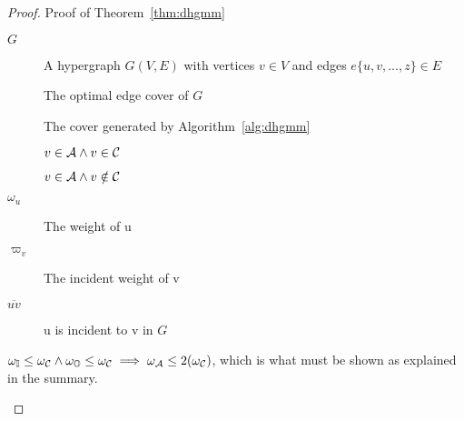 \begin{proof}{Proof of Theorem~\ref{thm:dhgmm}}
  \begin{dfn}
    \begin{description}
    \item[$G$] A hypergraph $G(V,E)$ with vertices $v \in V$ and edges $e\{u,v,...,z\} \in E$
    \item[\cCd] The optimal edge cover of $G$
    \item[\cAd] The cover generated by Algorithm~\ref{alg:dhgmm}
    \item[\bId] $v \in {\mathcal A} \land v\in {\mathcal C}$
    \item[\bOd] $v \in {\mathcal A} \land v\notin {\mathcal C}$
    \item[$\omega_u$] The weight of u
    \item[$\varpi_v$] The incident weight of v
    \item[$ \overline{uv} $] u is incident to v in $G$
    \end{description}
  \end{dfn}
  \begin{prop}
    $\omega_{{\mathbb I}} \le \omega_{{\mathcal C}} \land \omega_{{\mathbb O}} \le \omega_{{\mathcal C}} \implies \omega_{{\mathcal A}} \le 2(\omega_{{\mathcal C}})$, which is what must be shown as explained in the summary.
    \label{prp:weightcomp}
  \end{prop}


\end{proof}
